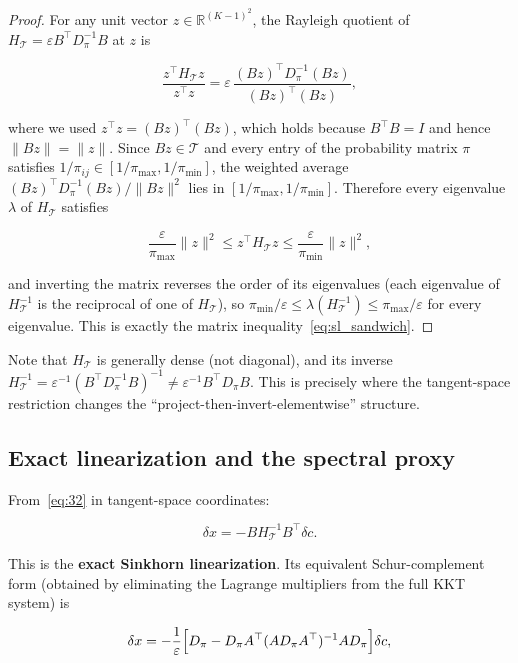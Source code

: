 \documentclass[11pt,a4paper]{article}
\theoremstyle{remark}
\begin{document}
\begin{proof}
For any unit vector $z\in\mathbb{R}^{(K-1)^2}$, the Rayleigh quotient of
$H_{\mathcal{T}}=\varepsilon B^{\top}D_\pi^{-1}B$ at $z$ is

\[
\frac{z^{\top}H_{\mathcal{T}}z}{z^{\top}z}=\varepsilon\,\frac{(Bz)^{\top}D_\pi^{-1}(Bz)}{(Bz)^{\top}(Bz)},
\]

where we used $z^{\top}z=(Bz)^{\top}(Bz)$, which holds because $B^{\top}B=I$ and hence
$\|Bz\|=\|z\|$. Since $Bz\in\mathcal{T}$ and every entry of the probability matrix $\pi$
satisfies $1/\pi_{ij}\in[1/\pi_{\max},1/\pi_{\min}]$, the weighted average
$(Bz)^{\top}D_\pi^{-1}(Bz)/\|Bz\|^2$ lies in $[1/\pi_{\max},1/\pi_{\min}]$. Therefore every
eigenvalue $\lambda$ of $H_{\mathcal{T}}$ satisfies

\[
\frac{\varepsilon}{\pi_{\max}}\|z\|^2\le z^{\top}H_{\mathcal{T}}z\le\frac{\varepsilon}{\pi_{\min}}\|z\|^2,
\]

and inverting the matrix reverses the order of its eigenvalues (each eigenvalue of
$H_{\mathcal{T}}^{-1}$ is the reciprocal of one of $H_{\mathcal{T}}$), so
$\pi_{\min}/\varepsilon\le\lambda(H_{\mathcal{T}}^{-1})\le\pi_{\max}/\varepsilon$ for every
eigenvalue. This is exactly the matrix inequality~\eqref{eq:sl_sandwich}.
\end{proof}

Note that $H_{\mathcal{T}}$ is generally dense (not diagonal), and its inverse
$H_{\mathcal{T}}^{-1}=\varepsilon^{-1}(B^{\top}D_\pi^{-1}B)^{-1}\neq\varepsilon^{-1}B^{\top}D_\pi B$.
This is precisely where the tangent-space restriction changes the
``project-then-invert-elementwise'' structure.

\subsection{Exact linearization and the spectral proxy}

From~\eqref{eq:32} in tangent-space coordinates:

\begin{equation}
\boxed{\delta x=-B H_{\mathcal{T}}^{-1}B^{\top}\delta c}. \label{eq:35}
\end{equation}

This is the \textbf{exact Sinkhorn linearization}. Its equivalent Schur-complement form
(obtained by eliminating the Lagrange multipliers from the full KKT system) is

\begin{equation}
\delta x=-\frac{1}{\varepsilon}\Bigl[D_\pi-D_\pi A^{\top}(AD_\pi A^{\top})^{-1}AD_\pi\Bigr]\delta c, \label{eq:36}
\end{equation}
\end{document}
